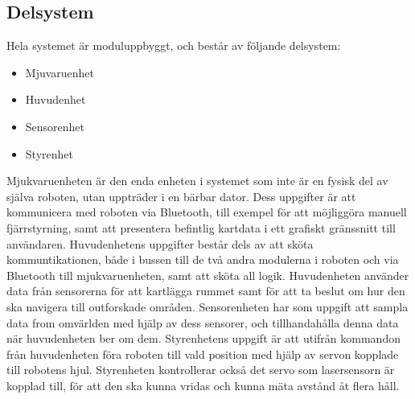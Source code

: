 \documentclass{article}
\begin{document}
\subsection{Delsystem}
Hela systemet är moduluppbyggt, och består av följande delsystem:
\begin{itemize}
\item Mjuvaruenhet
\item Huvudenhet
\item Sensorenhet
\item Styrenhet
\end{itemize}
Mjukvaruenheten är den enda enheten i systemet som inte är en fysisk del av själva roboten, utan uppträder i en bärbar dator. Dess uppgifter är att kommunicera med roboten via Bluetooth, till exempel för att möjliggöra manuell fjärrstyrning, samt att presentera befintlig kartdata i ett grafiskt gränssnitt till användaren.  
\newline\newline
Huvudenhetens uppgifter består dels av att sköta kommuntikationen, både i bussen till de två andra modulerna i roboten och via Bluetooth till mjukvaruenheten, samt att sköta all logik. Huvudenheten använder data från sensorerna för att kartlägga rummet samt för att ta beslut om hur den ska navigera till outforskade områden.
\newline\newline
Sensorenheten har som uppgift att sampla data from omvärlden med hjälp av dess sensorer, och tillhandahålla denna data när huvudenheten ber om dem.
Styrenhetens uppgift är att utifrån kommandon från huvudenheten föra roboten till vald position med hjälp av servon kopplade till robotens hjul. Styrenheten kontrollerar också det servo som lasersensorn är kopplad till, för att den ska kunna vridas och kunna mäta avstånd åt flera håll. 
\end{document}
